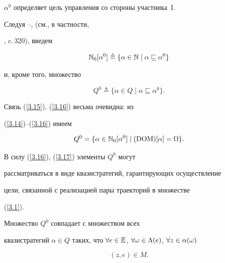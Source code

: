 ${\alpha}^0$ определяет цель управления со стороны участника~I. 


Следуя \cite{23}--\cite{26}, \cite{55} (см., в частности,


\cite{55}, c.\,320), введем


\begin{equation}\label{3.15}


{\Bbb{N}_0}[{\alpha}^0] \triangleq \{\alpha \in \Bbb{N} \mid


\alpha \sqsubseteq {{\alpha}^0}\}


\end{equation}


и, кроме того, множество


\begin{equation}\label{3.16}


{Q^0} \triangleq \{\alpha \in Q \mid \alpha \sqsubseteq {{\alpha}^0}\}.


\end{equation}


Связь (\ref{3.15}), (\ref{3.16}) весьма очевидна: из


(\ref{3.14})--(\ref{3.16}) имеем


\begin{equation}\label{3.17}


{Q^0} = \{\alpha \in {{\Bbb{N}}_0}[{\alpha}^0] \mid (\DOM)[\alpha]= \Om\}.


\end{equation}


В силу (\ref{3.16}), (\ref{3.17}) элементы $Q^0$ могут


рассматриваться в виде квазистратегий, гарантирующих осуществление


цели, связанной с реализацией пары траекторий в множестве


(\ref{3.1}).








\begin{props}


Множество $Q^0$ совпадает с множеством всех


квазистратегий $\alpha \in Q$ таких, что $\fo{e} \in


\Bbb{E}$, $\fo{\omega} \in {\Ld}(e)$, $\fo{z} \in {\alpha}(\omega)$


$$


(z,e) \in M.


$$


\end{props}





